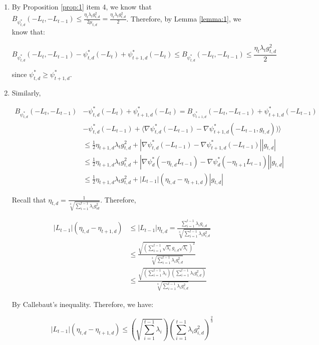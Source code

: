 \documentclass{article}
\begin{document}
\begin{enumerate}
  \item By Proposition \ref{prop:1} item 4, we know that $B_{\psi_{t,d}^*}(-L_t, -L_{t-1}) \leq \frac{\eta_t \lambda_t
    g_{t,d}^2}{2 \mu_{t,d}} = \frac{\eta_t \lambda_t g_{t,d}^2}{2}$. Therefore, by Lemma \ref{lemma:1}, we know that:

    \[
      B_{\psi_{t,d}^*}(-L_t, -L_{t-1}) - \psi_{t,d}^*(-L_t) + \psi_{t+1,d}^*(-L_t) \leq B_{\psi_{t,d}^*}(-L_t,
      -L_{t-1}) \leq \frac{\eta_t \lambda_t g_{t,d}^2}{2}
    \]

    since $\psi_{t,d}^* \geq \psi_{t+1,d}^*$.
  \item Similarly,

    \begin{align*}
      B_{\psi_{t,d}^*}(-L_t, -L_{t-1}) 
      &- \psi_{t,d}^*(-L_t) + \psi_{t+1,d}^*(-L_t) = B_{\psi_{t+1,d}^*}(-L_t, -L_{t-1}) + \psi_{t+1,d}^*(-L_{t-1}) \\
      & - \psi_{t,d}^*(-L_{t-1}) + \langle \nabla \psi_{t,d}^*(-L_{t-1}) - \nabla \psi_{t+1,d}^*(-L_{t-1},
      g_{t,d}))\rangle \\
      &\leq \frac{1}{2} \eta_{t+1,d}\lambda_t g_{t,d}^2 + | \nabla \psi_{t,d}^*(-L_{t-1}) - \nabla
      \psi_{t+1,d}^*(-L_{t-1})| |g_{t,d}| \\
      &\leq \frac{1}{2} \eta_{t+1,d}\lambda_t g_{t,d}^2 + | \nabla \psi_{d}^*(-\eta_{t,d} L_{t-1}) - \nabla
      \psi_{d}^*(-\eta_{t+1}L_{t-1})| |g_{t,d}| \\
      &\leq \frac{1}{2} \eta_{t+1,d}\lambda_t g_{t,d}^2 + |L_{t-1}|(\eta_{t,d} - \eta_{t+1,d})|g_{t,d}|
    \end{align*}

    Recall that $\eta_{t,d} = \frac{1}{\sqrt[3]{\sum\limits_{i=1}^{t-1} \lambda_i g_{id}^2}}$. Therefore,

    \begin{align*}
      |L_{t-1}|(\eta_{t,d} - \eta_{t+1,d}) 
      &\leq |L_{t-1}|\eta_{t,d} = \frac{\sum_{i=1}^{t-1} \lambda_i g_{i,d}}{\sqrt[3]{\sum_{i=1}^{t-1}\lambda_i
      g_{i,d}^2}} \\
      &\leq \frac{\sqrt{(\sum_{i=1}^{t-1} \sqrt{\lambda_i} g_{i,d}
      \sqrt{\lambda_i})^2}}{\sqrt[3]{\sum_{i=1}^{t-1} \lambda_i g_{i,d}^2}} \\
      &\leq \frac{\sqrt{(\sum_{i=1}^{t-1} \lambda_i)(\sum_{i=1}^{t-1}\lambda_i g_{i,d}^2)}}{\sqrt[3]{\sum_{i=1}^{t-1} \lambda_i g_{i,d}^2}}
    \end{align*}

    By Callebaut's inequality. Therefore, we have:

    \[
      |L_{t-1}|(\eta_{t,d} - \eta_{t+1,d}) \leq \left(\sqrt{\sum_{i=1}^{t-1} \lambda_i}\right)\left(\sum_{i=1}^{t-1}\lambda_i
      g_{i,d}^2\right)^\frac{2}{3}
    \]
\end{enumerate}
\end{document}

